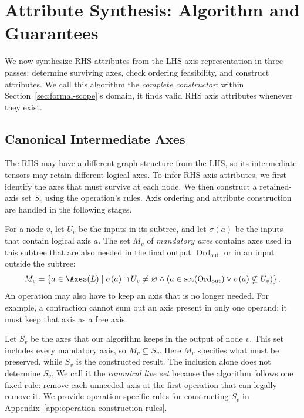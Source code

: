 \section{Attribute Synthesis: Algorithm and Guarantees}
\label{sec:mathematical-synthesis}
We now synthesize RHS attributes from the LHS axis representation in three
passes: determine surviving axes, check ordering feasibility, and construct
attributes. We call this algorithm the \emph{complete constructor}: within
Section~\ref{sec:formal-scope}'s domain, it finds valid RHS axis attributes
whenever they exist.

\subsection{Canonical Intermediate Axes}
\label{sec:canonical-axes}
The RHS may have a different graph structure from the LHS, so its
intermediate tensors may retain different logical axes. To infer RHS axis
attributes, we first identify the axes that must survive at each node.
We then construct a retained-axis set $S_v$ using the operation's rules.
Axis ordering and attribute construction are handled in the following stages.

For a node $v$, let $U_v$ be the inputs in its subtree, and let
$\sigma(a)$ be the inputs that contain logical axis $a$. The set $M_v$ of
\emph{mandatory axes} contains axes used in this subtree that are also needed in the
final output $\operatorname{Ord}_{\mathrm{out}}$ or in an input outside the subtree:
\begin{equation}
 M_v=\left\{a\in\Axes(L)\;\middle|\;
 \sigma(a)\cap U_v\ne\varnothing
 \land (a\in\operatorname{set}(\operatorname{Ord}_{\mathrm{out}})\lor\sigma(a)\nsubseteq U_v)
 \right\}.
 \label{eq:mandatory-axes}
\end{equation}
An operation may also have to keep an axis that is no longer needed.
For example, a contraction cannot sum out an axis present in only one
operand; it must keep that axis as a free axis.

Let $S_v$ be the axes that our algorithm keeps in the output of node
$v$.
This set includes every mandatory axis, so $M_v\subseteq S_v$.
Here $M_v$ specifies what must be preserved, while $S_v$ is the constructed
result. The inclusion alone does not determine $S_v$.
We call it the \emph{canonical live set} because the algorithm follows one
fixed rule: remove each unneeded axis at the first operation that can
legally remove it. We provide operation-specific rules for constructing
$S_v$ in Appendix~\ref{app:operation-construction-rules}.

